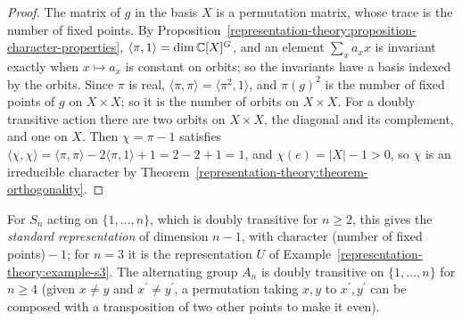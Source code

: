 \begin{proof}
The matrix of $g$ in the basis $X$ is a permutation matrix, whose trace is the number of fixed points. By Proposition~\ref{representation-theory:proposition-character-properties},
$\langle\pi, 1\rangle = \dim\mathbb{C}[X]^G$, and an element $\sum_xa_xx$ is invariant exactly when $x \mapsto a_x$ is constant on orbits; so the invariants have a basis indexed by the
orbits. Since $\pi$ is real, $\langle\pi, \pi\rangle = \langle\pi^2, 1\rangle$, and $\pi(g)^2$ is the number of fixed points of $g$ on $X \times X$; so it is the number of orbits on
$X \times X$. For a doubly transitive action there are two orbits on $X \times X$, the diagonal and its complement, and one on $X$. Then $\chi = \pi - 1$ satisfies
$\langle\chi, \chi\rangle = \langle\pi, \pi\rangle - 2\langle\pi, 1\rangle + 1 = 2 - 2 + 1 = 1$, and $\chi(e) = |X| - 1 > 0$, so $\chi$ is an irreducible character by
Theorem~\ref{representation-theory:theorem-orthogonality}.
\end{proof}

For $S_n$ acting on $\{1, \ldots, n\}$, which is doubly transitive for $n \geq 2$, this gives the \emph{standard representation} of dimension $n - 1$, with character
(number of fixed points)${} - 1$; for $n = 3$ it is the representation $U$ of Example~\ref{representation-theory:example-s3}. The alternating group $A_n$ is doubly transitive
on $\{1, \ldots, n\}$ for $n \geq 4$ (given $x \neq y$ and $x^{\prime} \neq y^{\prime}$, a permutation taking $x, y$ to $x^{\prime}, y^{\prime}$ can be composed with a transposition of two other points to make
it even).

